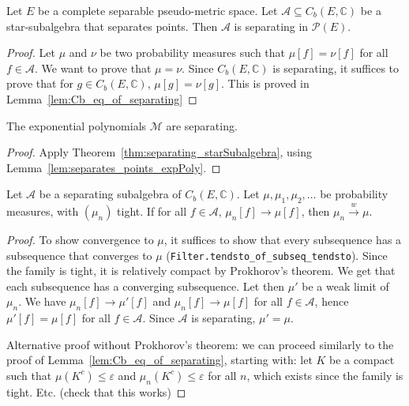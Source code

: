 \begin{theorem}\label{thm:separating_starSubalgebra}
Let $E$ be a complete separable pseudo-metric space. Let $\mathcal A \subseteq C_b(E, \mathbb{C})$ be a star-subalgebra that separates points. Then $\mathcal A$ is separating in $\mathcal P(E)$.
\end{theorem}

\begin{proof}
Let $\mu$ and $\nu$ be two probability measures such that $\mu[f] = \nu[f]$ for all $f \in \mathcal A$. We want to prove that $\mu = \nu$. Since $C_b(E, \mathbb{C})$ is separating, it suffices to prove that for $g \in C_b(E, \mathbb{C})$, $\mu[g] = \nu[g]$. This is proved in Lemma~\ref{lem:Cb_eq_of_separating}
\end{proof}


\begin{lemma}\label{lem:separating_expPoly}
The exponential polynomials $\mathcal M$ are separating.
\end{lemma}

\begin{proof}
Apply Theorem~\ref{thm:separating_starSubalgebra}, using Lemma~\ref{lem:separates_points_expPoly}.
\end{proof}


\begin{lemma}\label{lem:cvg_of_separating}
Let $\mathcal A$ be a separating subalgebra of $C_b(E, \mathbb{C})$. Let $\mu, \mu_1, \mu_2, \ldots$ be probability measures, with $(\mu_n)$ tight. If for all $f \in \mathcal A$, $\mu_n[f] \to \mu[f]$, then $\mu_n \xrightarrow{w} \mu$.
\end{lemma}

\begin{proof}
To show convergence to $\mu$, it suffices to show that every subsequence has a subsequence that converges to $\mu$ (\texttt{Filter.tendsto\_of\_subseq\_tendsto}).
Since the family is tight, it is relatively compact by Prokhorov's theorem. We get that each subsequence has a converging subsequence.
Let then $\mu'$ be a weak limit of $\mu_n$. We have $\mu_n[f] \to \mu'[f]$ and $\mu_n[f] \to \mu[f]$ for all $f \in \mathcal A$, hence $\mu'[f] = \mu[f]$ for all $f \in \mathcal A$. Since $\mathcal A$ is separating, $\mathcal \mu' = \mu$.

Alternative proof without Prokhorov's theorem: we can proceed similarly to the proof of Lemma~\ref{lem:Cb_eq_of_separating}, starting with: let $K$ be a compact such that $\mu(K^c) \le \varepsilon$ and $\mu_n(K^c) \le \varepsilon$ for all $n$, which exists since the family is tight. Etc. (check that this works)
\end{proof}
